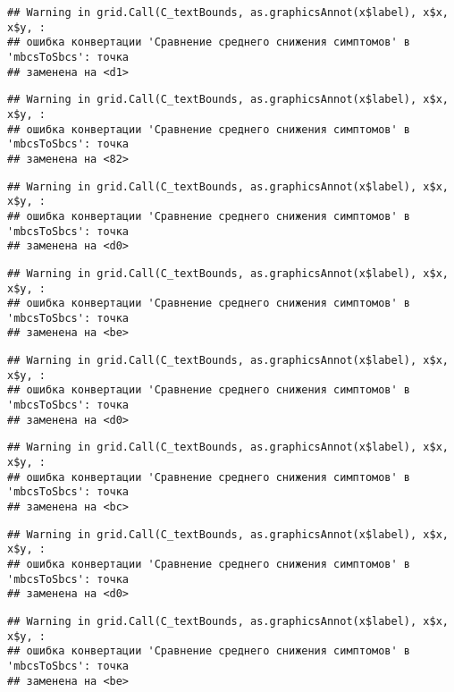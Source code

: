 \documentclass[
]{article}
\begin{document}
\begin{verbatim}
## Warning in grid.Call(C_textBounds, as.graphicsAnnot(x$label), x$x, x$y, :
## ошибка конвертации 'Сравнение среднего снижения симптомов' в 'mbcsToSbcs': точка
## заменена на <d1>
\end{verbatim}

\begin{verbatim}
## Warning in grid.Call(C_textBounds, as.graphicsAnnot(x$label), x$x, x$y, :
## ошибка конвертации 'Сравнение среднего снижения симптомов' в 'mbcsToSbcs': точка
## заменена на <82>
\end{verbatim}

\begin{verbatim}
## Warning in grid.Call(C_textBounds, as.graphicsAnnot(x$label), x$x, x$y, :
## ошибка конвертации 'Сравнение среднего снижения симптомов' в 'mbcsToSbcs': точка
## заменена на <d0>
\end{verbatim}

\begin{verbatim}
## Warning in grid.Call(C_textBounds, as.graphicsAnnot(x$label), x$x, x$y, :
## ошибка конвертации 'Сравнение среднего снижения симптомов' в 'mbcsToSbcs': точка
## заменена на <be>
\end{verbatim}

\begin{verbatim}
## Warning in grid.Call(C_textBounds, as.graphicsAnnot(x$label), x$x, x$y, :
## ошибка конвертации 'Сравнение среднего снижения симптомов' в 'mbcsToSbcs': точка
## заменена на <d0>
\end{verbatim}

\begin{verbatim}
## Warning in grid.Call(C_textBounds, as.graphicsAnnot(x$label), x$x, x$y, :
## ошибка конвертации 'Сравнение среднего снижения симптомов' в 'mbcsToSbcs': точка
## заменена на <bc>
\end{verbatim}

\begin{verbatim}
## Warning in grid.Call(C_textBounds, as.graphicsAnnot(x$label), x$x, x$y, :
## ошибка конвертации 'Сравнение среднего снижения симптомов' в 'mbcsToSbcs': точка
## заменена на <d0>
\end{verbatim}

\begin{verbatim}
## Warning in grid.Call(C_textBounds, as.graphicsAnnot(x$label), x$x, x$y, :
## ошибка конвертации 'Сравнение среднего снижения симптомов' в 'mbcsToSbcs': точка
## заменена на <be>
\end{verbatim}
\end{document}
